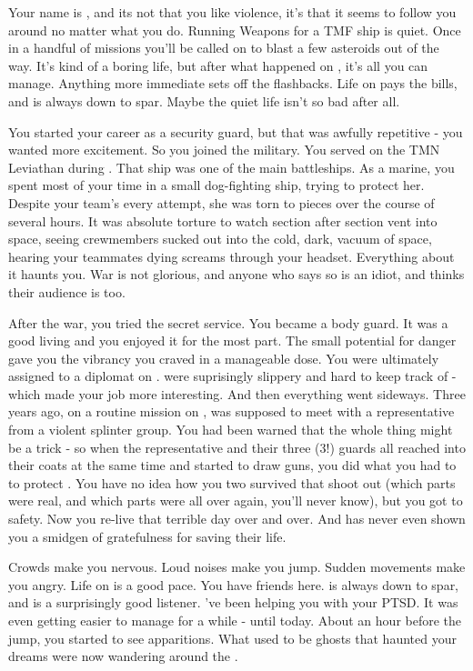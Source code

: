 \documentclass[char]{TMFHope}
\begin{document}
\name{\cWeap{}}

Your name is \cWeap{}, and its not that you like violence, it's that it seems to follow you around no matter what you do. Running Weapons for a TMF ship is quiet. Once in a handful of missions you'll be called on to blast a few asteroids out of the way. It's kind of a boring life, but after what happened on \pHome{}, it's all you can manage. Anything more immediate sets off the flashbacks. Life on \pNew{} pays the bills, and \cSci{} is always down to spar. Maybe the quiet life isn't so bad after all.

You started your career as a security guard, but that was awfully repetitive - you wanted more excitement. So you joined the military. You served on the TMN Leviathan during \pBattle{}. That ship was one of the \pPlan{} main battleships. As a marine, you spent most of your time in a small dog-fighting ship, trying to protect her. Despite your team's every attempt, she was torn to pieces over the course of several hours. It was absolute torture to watch section after section vent into space, seeing crewmembers sucked out into the cold, dark, vacuum of space, hearing your teammates dying screams through your headset. Everything about it haunts you. War is not glorious, and anyone who says so is an idiot, and thinks their audience is too.

After the war, you tried the \pPlan{} secret service. You became a body guard. It was a good living and you enjoyed it for the most part. The small potential for danger gave you the vibrancy you craved in a manageable dose. You were ultimately assigned to a diplomat on \pHome{}. \cDip{\They} were suprisingly slippery and hard to keep track of - which made your job more interesting. And then everything went sideways. Three years ago, on a routine mission on \pHome{}, \cDip{} was supposed to meet with a representative from a violent splinter group. You had been warned that the whole thing might be a trick - so when the representative and their three (3!) guards all reached into their coats at the same time and started to draw guns, you did what you had to to protect \cDip{}. You have no idea how you two survived that shoot out (which parts were real, and which parts were \pBattle{} all over again, you'll never know), but you got \cDip{\them} to safety. Now you re-live that terrible day over and over. And \cDip{} has never even shown you a smidgen of gratefulness for saving their life.

Crowds make you nervous. Loud noises make you jump. Sudden movements make you angry. Life on \pNew{} is a good pace. You have friends here. \cSci{} is always down to spar, and \cNav{} is a surprisingly good listener. \cNav{\They}'ve been helping you with your PTSD. It was even getting easier to manage for a while - until today. About an hour before the jump, you started to see apparitions. What used to be ghosts that haunted your dreams were now wandering around the \pNew{}.
\end{document}
